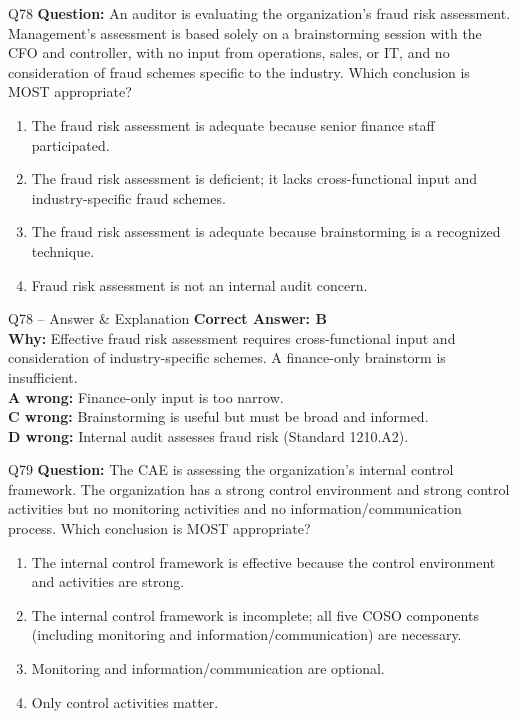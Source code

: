 \documentclass[aspectratio=169,10pt]{beamer}
\begin{document}
	\begin{frame}[t]{Q78}
		\small
		\textbf{Question:} An auditor is evaluating the organization's fraud risk assessment. Management's assessment is based solely on a brainstorming session with the CFO and controller, with no input from operations, sales, or IT, and no consideration of fraud schemes specific to the industry. Which conclusion is MOST appropriate?
		\begin{enumerate}[label=\Alph*.,itemsep=1pt,topsep=2pt]
			\item The fraud risk assessment is adequate because senior finance staff participated.
			\item The fraud risk assessment is deficient; it lacks cross-functional input and industry-specific fraud schemes.
			\item The fraud risk assessment is adequate because brainstorming is a recognized technique.
			\item Fraud risk assessment is not an internal audit concern.
		\end{enumerate}
	\end{frame}
	
	\begin{frame}[t]{Q78 -- Answer \& Explanation}
		\small
		\textbf{Correct Answer: B} \\[4pt]
		\textbf{Why:} Effective fraud risk assessment requires cross-functional input and consideration of industry-specific schemes. A finance-only brainstorm is insufficient. \\[4pt]
		\textbf{A wrong:} Finance-only input is too narrow. \\[2pt]
		\textbf{C wrong:} Brainstorming is useful but must be broad and informed. \\[2pt]
		\textbf{D wrong:} Internal audit assesses fraud risk (Standard 1210.A2).
	\end{frame}
	
	\begin{frame}[t]{Q79}
		\small
		\textbf{Question:} The CAE is assessing the organization's internal control framework. The organization has a strong control environment and strong control activities but no monitoring activities and no information/communication process. Which conclusion is MOST appropriate?
		\begin{enumerate}[label=\Alph*.,itemsep=1pt,topsep=2pt]
			\item The internal control framework is effective because the control environment and activities are strong.
			\item The internal control framework is incomplete; all five COSO components (including monitoring and information/communication) are necessary.
			\item Monitoring and information/communication are optional.
			\item Only control activities matter.
		\end{enumerate}
	\end{frame}
	
\end{document}

